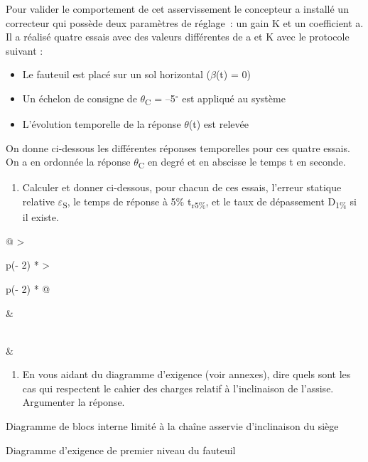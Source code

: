 Pour valider le comportement de cet asservissement le concepteur a
installé un correcteur qui possède deux paramètres de réglage~: un gain
K et un coefficient a. Il a réalisé quatre essais avec des valeurs
différentes de a et K avec le protocole suivant :

\begin{itemize}
\item
  Le fauteuil est placé sur un sol horizontal ($\beta$(t) = 0)
\item
  Un échelon de consigne de $\theta$\textsubscript{C} = --5$^\circ$ est appliqué au
  système
\item
  L'évolution temporelle de la réponse $\theta$(t) est relevée
\end{itemize}

On donne ci-dessous les différentes réponses temporelles pour ces quatre
essais. On a en ordonnée la réponse $\theta$\textsubscript{C} en degré et en
abscisse le temps t en seconde.

\begin{enumerate}
\def\labelenumi{\arabic{enumi}.}
\setcounter{enumi}{3}
\item
  Calculer et donner ci-dessous, pour chacun de ces essais, l'erreur
  statique relative $\varepsilon$\textsubscript{S}, le temps de réponse à 5\%
  t\textsubscript{r5\%}, et le taux de dépassement D\textsubscript{1\%}
  si il existe.
\end{enumerate}

\begin{longtable}[]{@{}
  >{\raggedright\arraybackslash}p{(\columnwidth - 2\tabcolsep) * }
  >{\raggedright\arraybackslash}p{(\columnwidth - 2\tabcolsep) * }@{}}
\toprule\noalign{}
\begin{minipage}[b]{\linewidth}\raggedright
{}
\end{minipage} & \begin{minipage}[b]{\linewidth}\raggedright
{}
\end{minipage} \\
\midrule\noalign{}
\endhead
\bottomrule\noalign{}
\endlastfoot
{} &
 \\
\end{longtable}

\begin{enumerate}
\def\labelenumi{\arabic{enumi}.}
\setcounter{enumi}{4}
\item
  En vous aidant du diagramme d'exigence (voir annexes), dire quels sont
  les cas qui respectent le cahier des charges relatif à l'inclinaison
  de l'assise. Argumenter la réponse.
\end{enumerate}


Diagramme de blocs interne limité à la chaîne asservie d'inclinaison du
siège


Diagramme d'exigence de premier niveau du fauteuil
